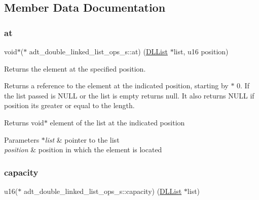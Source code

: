 \subsection{Member Data Documentation}
\mbox{\label{structadt__double__linked__list__ops__s_a4a8f2937537767814a0b7775d09de4c5}} 
\subsubsection{\texorpdfstring{at}{at}}
{\footnotesize\ttfamily void$\ast$($\ast$ adt\+\_\+double\+\_\+linked\+\_\+list\+\_\+ops\+\_\+s\+::at) (\hyperlink{structadt__double__linked__list__s}{D\+L\+List} $\ast$list, u16 position)}



Returns the element at the specified position. 

Returns a reference to the element at the indicated position, starting by $\ast$ 0. If the list passed is N\+U\+LL or the list is empty returns null. It also returns N\+U\+LL if position it\textquotesingle{}s greater or equal to the length.

\begin{DoxyReturn}{Returns}
void$\ast$ element of the list at the indicated position 
\end{DoxyReturn}

\begin{DoxyParams}{Parameters}
{\em $\ast$list} & pointer to the list \\
\hline
{\em position} & position in which the element is located \\
\hline
\end{DoxyParams}
\mbox{\label{structadt__double__linked__list__ops__s_adfa3417ca009567eeb9382f735cf6482}} 
\subsubsection{\texorpdfstring{capacity}{capacity}}
{\footnotesize\ttfamily u16($\ast$ adt\+\_\+double\+\_\+linked\+\_\+list\+\_\+ops\+\_\+s\+::capacity) (\hyperlink{structadt__double__linked__list__s}{D\+L\+List} $\ast$list)}



